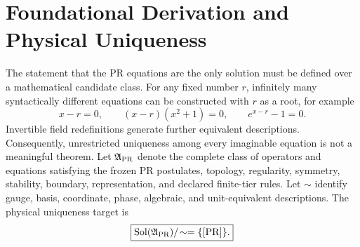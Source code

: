 \section{Foundational Derivation and Physical Uniqueness}
\label{sec:pr35-foundational-derivation-standard}

The statement that the PR equations are the only solution must be defined over
a mathematical candidate class.  For any fixed number $r$, infinitely many
syntactically different equations can be constructed with $r$ as a root,
for example
\begin{equation}
x-r=0,
\qquad
(x-r)(x^2+1)=0,
\qquad
e^{x-r}-1=0.
\end{equation}
Invertible field redefinitions generate further equivalent descriptions.
Consequently, unrestricted uniqueness among every imaginable equation is not
a meaningful theorem. Let \(\mathfrak A_{\rm PR}\) denote the complete class of operators and equations satisfying the frozen PR postulates, topology, regularity, symmetry, stability, boundary, representation, and declared finite-tier rules.  Let
\(\sim\) identify gauge, basis, coordinate, phase, algebraic, and unit-equivalent
descriptions.  The physical uniqueness target is
\begin{equation}
\boxed{
\operatorname{Sol}(\mathfrak A_{\rm PR})/\!\sim
=
\{[\mathrm{PR}]\}.}
\label{eq:pr35-physical-uniqueness-target}
\end{equation}

